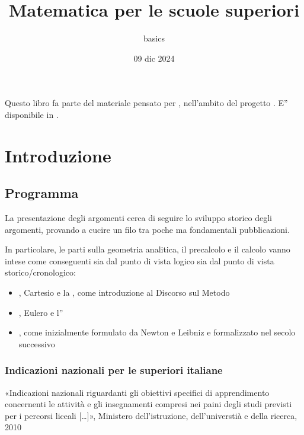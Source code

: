 \documentclass[letterpaper,10pt,italian]{jupyterBook}
\title{Matematica per le scuole superiori}
\date{09 dic 2024}
\author{basics}
\begin{document}
\pagestyle{empty}
\sphinxmaketitle
\pagestyle{plain}
\sphinxtableofcontents
\pagestyle{normal}
\label{\detokenize{intro::doc}}


\sphinxAtStartPar
Questo libro fa parte del materiale pensato per , nell’ambito del progetto . E” disponibile in .









\sphinxstepscope


\part{Introduzione}

\sphinxstepscope


\chapter{Programma}
\label{\detokenize{ch/program:programma}}\label{\detokenize{ch/program::doc}}
\sphinxAtStartPar
La presentazione degli argomenti cerca di seguire lo sviluppo storico degli argomenti, provando a cucire un filo tra poche ma fondamentali pubblicazioni.

\sphinxAtStartPar
In particolare, le parti sulla geometria analitica, il precalcolo e il calcolo vanno intese come conseguenti sia dal punto di vista logico sia dal punto di vista storico/cronologico:
\begin{itemize}
\item {} 
\sphinxAtStartPar
{}, Cartesio e la , come introduzione al Discorso sul Metodo

\item {} 
\sphinxAtStartPar
{}, Eulero e l”

\item {} 
\sphinxAtStartPar
{}, come inizialmente formulato da Newton e Leibniz e formalizzato nel secolo successivo

\end{itemize}

\sphinxstepscope


\section{Indicazioni nazionali per le superiori italiane}
\label{\detokenize{ch/program/current-guidelines-italy:indicazioni-nazionali-per-le-superiori-italiane}}\label{\detokenize{ch/program/current-guidelines-italy::doc}}
\sphinxAtStartPar
«Indicazioni nazionali riguardanti gli obiettivi specifici di apprendimento concernenti le attività e gli insegnamenti compresi nei paini degli studi previsti per i percorsi liceali {[}…{]}», Ministero dell’istruzione, dell’universtià e della ricerca, 2010
\end{document}
